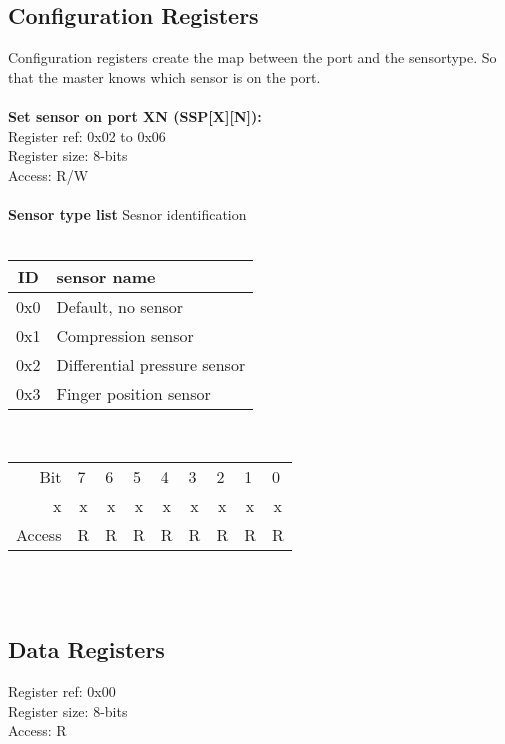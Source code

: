 \subsection{Configuration Registers}
Configuration registers create the map between the port and the sensortype. So that the master knows which sensor is on the port.\\\\
\textbf{Set sensor on port XN (SSP[X][N]):}\\
Register ref: 0x02 to 0x06\\
Register size: 8-bits\\
Access: R/W
\\\\
\textbf{Sensor type list} Sesnor identification\\\\
\begin{tabular}{|c|l|}
    \hline
   ID & sensor name\\ \hline
   0x0 & Default, no sensor\\ \hline
   0x1 & Compression sensor\\ \hline
   0x2 & Differential pressure sensor\\ \hline
   0x3 & Finger position sensor\\ \hline
\end{tabular}
\vspace{0.5cm} \\
\begin{tabular}{rp{1.25cm}p{1.25cm}p{1.25cm}p{1.25cm}p{1.25cm}p{1.25cm}p{1.25cm}p{1.25cm}}
Bit &
  7 &
  6 &
  5 &
  4 &
  3 &
  2 &
  1 &
  0 \\ \cline{2-9} 

\multicolumn{1}{r|}{x} &
  \multicolumn{1}{c|}{x} &
  \multicolumn{1}{c|}{x} & 
  \multicolumn{1}{c|}{x} &
  \multicolumn{1}{c|}{x} & 
  \multicolumn{1}{c|}{x} & 
  \multicolumn{1}{c|}{x} &
  \multicolumn{1}{c|}{x} &
  \multicolumn{1}{c|}{x} \\\cline{2-9} 
  
Access &
  R &
  R &
  R &
  R &
  R &
  R &
  R &
  R
\end{tabular}\\\\

\subsection{Data Registers}
Register ref: 0x00\\
Register size: 8-bits\\
Access: R\\

